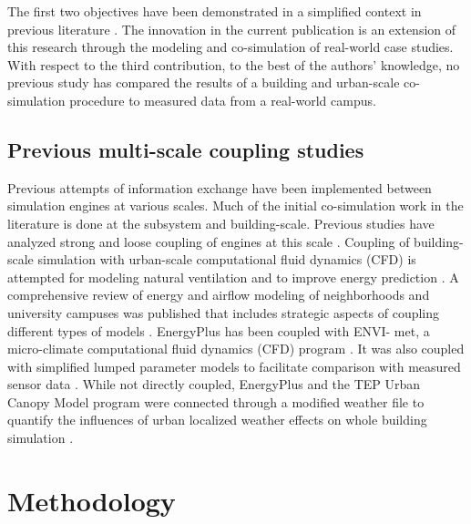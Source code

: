 \documentclass{tBPS2e}
\theoremstyle{plain}
\theoremstyle{definition}
\theoremstyle{remark}
\newcommand{\noteDT}[1]{\footnote{\textcolor{green}{#1}}}
\begin{document}
The first two objectives have been demonstrated in a simplified context in
previous literature \citep{thomas_customizable_2012,miller_long_2015}. The innovation
in the current publication is an extension of this research through the
modeling and co-simulation of real-world case studies. With respect to the
third contribution, to the best of the authors' knowledge, no previous study
has compared the results of a building and urban-scale co-simulation procedure
to measured data from a real-world campus.%

\subsection{Previous multi-scale coupling studies}
Previous attempts of information exchange have been implemented between
simulation engines at various scales. Much of the initial co-simulation work
in the literature is done at the subsystem and building-scale. Previous studies
have analyzed strong and loose coupling of engines at this scale
\citep{wetter_co-simulation_2011,trcka_co-simulation_2010}. Coupling of building-scale simulation with
urban-scale computational fluid dynamics (CFD) is attempted for modeling
natural ventilation \citep{zhang_coupled_2013} and to improve energy prediction
\citep{bouyer_microclimatic_2011}. A comprehensive review of energy and airflow modeling
of neighborhoods and university campuses was published that includes
strategic aspects of coupling different %
types of models \citep{srebric_building_2015}. EnergyPlus has been coupled with ENVI-
met, a micro-climate computational fluid dynamics (CFD) program
\citep{yang_integrated_2012}. It was also coupled with simplified lumped parameter
models to facilitate comparison with measured sensor data
\citep{martin_estimation_2015}. While not directly coupled, EnergyPlus and the TEP Urban Canopy Model program were connected
through a modified weather file to quantify the influences of urban localized weather effects
on whole building simulation \citep{bueno_combining_2011}.

\section{Methodology}
\label{Methodology}
\end{document}
